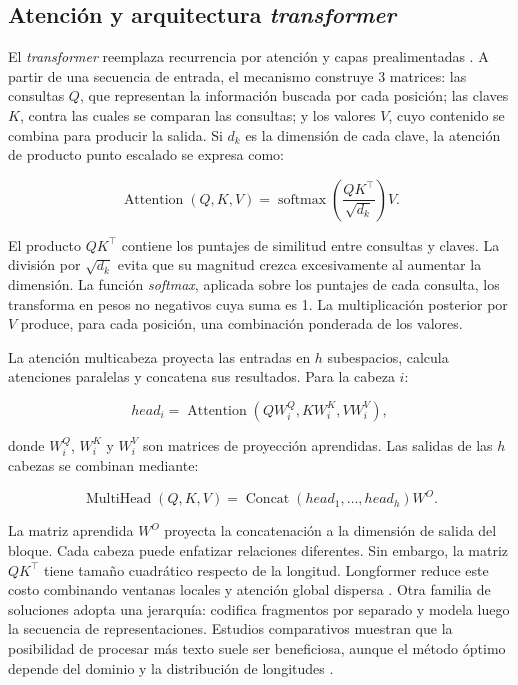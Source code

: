 \subsection{Atención y arquitectura \textit{transformer}}

El \textit{transformer} reemplaza recurrencia por atención y capas prealimentadas \parencite{vaswani2017attention}. A partir de una secuencia de entrada, el mecanismo construye 3 matrices: las consultas $Q$, que representan la información buscada por cada posición; las claves $K$, contra las cuales se comparan las consultas; y los valores $V$, cuyo contenido se combina para producir la salida. Si $d_k$ es la dimensión de cada clave, la atención de producto punto escalado se expresa como:

\begin{equation}
  \operatorname{Attention}(Q,K,V)=\operatorname{softmax}\left(\frac{QK^\top}{\sqrt{d_k}}\right)V.
\end{equation}

El producto $QK^\top$ contiene los puntajes de similitud entre consultas y claves. La división por $\sqrt{d_k}$ evita que su magnitud crezca excesivamente al aumentar la dimensión. La función \emph{softmax}, aplicada sobre los puntajes de cada consulta, los transforma en pesos no negativos cuya suma es 1. La multiplicación posterior por $V$ produce, para cada posición, una combinación ponderada de los valores.

La atención multicabeza proyecta las entradas en $h$ subespacios, calcula atenciones paralelas y concatena sus resultados. Para la cabeza $i$:

\begin{equation}
  head_i=\operatorname{Attention}(QW_i^Q,KW_i^K,VW_i^V),
\end{equation}

donde $W_i^Q$, $W_i^K$ y $W_i^V$ son matrices de proyección aprendidas. Las salidas de las $h$ cabezas se combinan mediante:

\begin{equation}
  \operatorname{MultiHead}(Q,K,V)=\operatorname{Concat}(head_1,\ldots,head_h)W^O.
\end{equation}

La matriz aprendida $W^O$ proyecta la concatenación a la dimensión de salida del bloque. Cada cabeza puede enfatizar relaciones diferentes. Sin embargo, la matriz $QK^\top$ tiene tamaño cuadrático respecto de la longitud. Longformer reduce este costo combinando ventanas locales y atención global dispersa \parencite{beltagy2020longformer}. Otra familia de soluciones adopta una jerarquía: codifica fragmentos por separado y modela luego la secuencia de representaciones. Estudios comparativos muestran que la posibilidad de procesar más texto suele ser beneficiosa, aunque el método óptimo depende del dominio y la distribución de longitudes \parencite{dai2022revisiting,mamakas2022legal}.

